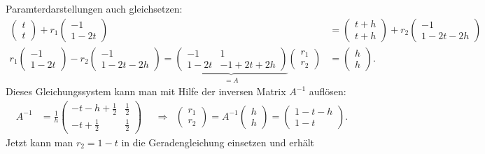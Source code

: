 \begin{loesung}
Paramterdarstellungen auch gleichsetzen:
\begin{align*}
\begin{pmatrix}t\\t\end{pmatrix}
+r_1\begin{pmatrix}-1\\1-2t\end{pmatrix}
&=
\begin{pmatrix}t+h\\t+h\end{pmatrix}
+r_2\begin{pmatrix}-1\\1-2t-2h\end{pmatrix}
\\
r_1\begin{pmatrix}-1\\1-2t\end{pmatrix}
-r_2\begin{pmatrix}-1\\1-2t-2h\end{pmatrix}
=
\underbrace{
\begin{pmatrix}
-1&1\\
1-2t&-1+2t+2h
\end{pmatrix}
}_{\displaystyle=A}
\begin{pmatrix}r_1\\r_2 \end{pmatrix}
&=
\begin{pmatrix}h\\h\end{pmatrix}.
\end{align*}
Dieses Gleichungssystem kann man mit Hilfe der inversen Matrix $A^{-1}$
auflösen:
\begin{align*}
A^{-1}
&=
\frac1h
\begin{pmatrix}
-t-h+\frac12 & \frac12 \\
-t+\frac12 & \frac12
\end{pmatrix}
&&\Rightarrow&
\begin{pmatrix}r_1\\r_2\end{pmatrix}
=
A^{-1}\begin{pmatrix}h\\h\end{pmatrix}
=
\begin{pmatrix}
1-t-h\\
1-t
\end{pmatrix}.
\end{align*}
Jetzt kann man $r_2=1-t$ in die Geradengleichung einsetzen und erhält

\end{loesung}

